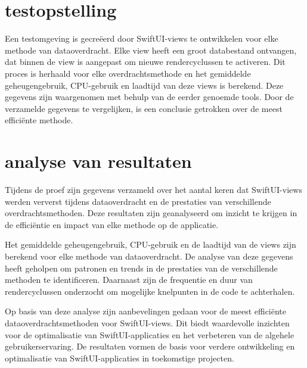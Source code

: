 \section{testopstelling}
Een testomgeving is gecreëerd door SwiftUI-views te ontwikkelen voor elke methode van dataoverdracht. Elke view heeft een groot databestand ontvangen, dat binnen de view is aangepast om nieuwe rendercyclussen te activeren. Dit proces is herhaald voor elke overdrachtsmethode en het gemiddelde geheugengebruik, CPU-gebruik en laadtijd van deze views is berekend. Deze gegevens zijn waargenomen met behulp van de eerder genoemde tools. Door de verzamelde gegevens te vergelijken, is een conclusie getrokken over de meest efficiënte methode. 

\section{analyse van resultaten}
Tijdens de proef zijn gegevens verzameld over het aantal keren dat SwiftUI-views werden ververst tijdens dataoverdracht en de prestaties van verschillende overdrachtsmethoden. Deze resultaten zijn geanalyseerd om inzicht te krijgen in de efficiëntie en impact van elke methode op de applicatie.

Het gemiddelde geheugengebruik, CPU-gebruik en de laadtijd van de views zijn berekend voor elke methode van dataoverdracht. De analyse van deze gegevens heeft geholpen om patronen en trends in de prestaties van de verschillende methoden te identificeren. Daarnaast zijn de frequentie en duur van rendercyclussen onderzocht om mogelijke knelpunten in de code te achterhalen.

Op basis van deze analyse zijn aanbevelingen gedaan voor de meest efficiënte dataoverdrachtsmethoden voor SwiftUI-views. Dit biedt waardevolle inzichten voor de optimalisatie van SwiftUI-applicaties en het verbeteren van de algehele gebruikerservaring. De resultaten vormen de basis voor verdere ontwikkeling en optimalisatie van SwiftUI-applicaties in toekomstige projecten.


